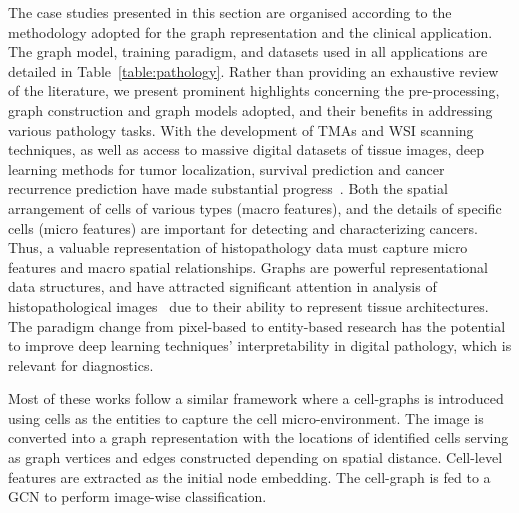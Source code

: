 \label{sec:sec3}
The case studies presented in this section are organised according to the methodology adopted for the graph representation and the clinical application. The graph model, training paradigm, and datasets used in all applications are detailed in Table~\ref{table:pathology}. 
Rather than providing an exhaustive review of the literature, we present prominent highlights concerning the pre-processing, graph construction and graph models adopted, and their benefits in addressing various pathology tasks.
With the development of TMAs and WSI scanning techniques, as well as access to massive digital datasets of tissue images, deep learning methods for tumor localization, survival prediction and cancer recurrence prediction have made substantial progress~. 
Both the spatial arrangement of cells of various types (macro features), and the details of specific cells (micro features) are important for detecting and characterizing cancers. Thus, a valuable representation of histopathology data must capture micro features and macro spatial relationships.
Graphs are powerful representational data structures, and have attracted significant attention in analysis of histopathological images~ due to their ability to represent tissue architectures. The paradigm change from pixel-based to entity-based research has the potential to improve deep learning techniques' interpretability in digital pathology, which is relevant for diagnostics.
\vspace{-6pt}

Most of these works follow a similar framework where a cell-graphs is introduced using cells as the entities to capture the cell micro-environment. The image is converted into a graph representation with the locations of identified cells serving as graph vertices and edges constructed depending on spatial distance. Cell-level features are extracted as the initial node embedding. The cell-graph is fed to a GCN to perform image-wise classification.


